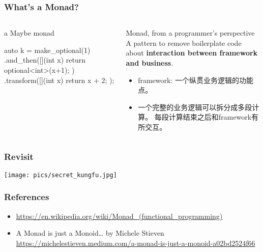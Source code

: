 \documentclass[UTF8,lualatex]{ctexbeamer}
\renewcommand{\emph}[1]{\textbf{#1}}
\begin{document}
\begin{frame}[fragile]
    \frametitle{What's a Monad?}
    \begin{columns}
        \begin{column}{.5\textwidth}
            \begin{exampleblock}{a Maybe monad}
                \footnotesize
                \begin{cppcode}
                    auto k = make_optional(1)
                        .and_then([](int x) {
                            return optional<int>(x+1);
                        })
                        .transform([](int x) {
                            return x + 2;
                        });
                \end{cppcode}
            \end{exampleblock}
        \end{column}
        \begin{column}{.5\textwidth}
            \begin{block}{Monad, from a programmer's perspective}
                A pattern to remove boilerplate code about \emph{interaction between framework and business}.
                \begin{itemize}
                    \item framework: 一个纵贯业务逻辑的功能点。
                    \item 一个完整的业务逻辑可以拆分成多段计算。
                        每段计算结束之后和framework有所交互。
                \end{itemize}
            \end{block}
        \end{column}
    \end{columns}
\end{frame}


\begin{frame}
    \frametitle{Revisit}
    \tableofcontents
\end{frame}

\begin{frame}[plain]
    \begin{center}
        \texttt{[image: pics/secret\_kungfu.jpg]}
    \end{center}
\end{frame}

\begin{frame}
    \frametitle{References}
    \begin{itemize}
        \item \url{https://en.wikipedia.org/wiki/Monad_(functional_programming)}
        \item A Monad is just a Monoid… by Michele Stieven \url{https://michelestieven.medium.com/a-monad-is-just-a-monoid-a02bd2524f66}
    \end{itemize}
\end{frame}
\end{document}
